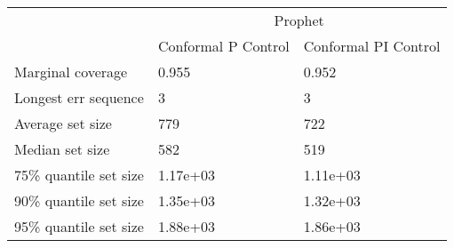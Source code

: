 \begin{tabular}{lll}
\toprule
& \multicolumn{2}{c}{Prophet} \\
& Conformal P Control & Conformal PI Control \\
\midrule
Marginal coverage & 0.955 & 0.952 \\
Longest err sequence & 3 & 3 \\
Average set size & 779 & 722 \\
Median set size & 582 & 519 \\
75\% quantile set size & 1.17e+03 & 1.11e+03 \\
90\% quantile set size & 1.35e+03 & 1.32e+03 \\
95\% quantile set size & 1.88e+03 & 1.86e+03 \\
\bottomrule
\end{tabular}
